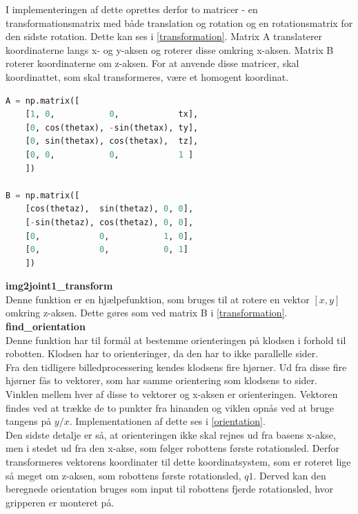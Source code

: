 I implementeringen af dette oprettes derfor to matricer - en transformationsmatrix med både translation og rotation og en rotationsmatrix for den sidste rotation. Dette kan ses i \autoref{transformation}. Matrix A translaterer koordinaterne langs x- og y-aksen og roterer disse omkring x-aksen. Matrix B roterer koordinaterne om z-aksen. For at anvende disse matricer, skal koordinattet, som skal transformeres, være et homogent koordinat.

\begin{lstlisting}[caption=Matricer til transformation., label=transformation, language=Python]
A = np.matrix([
    [1, 0,           0,            tx],
    [0, cos(thetax), -sin(thetax), ty],
    [0, sin(thetax), cos(thetax),  tz],
    [0, 0,           0,            1 ]
    ])

B = np.matrix([
    [cos(thetaz),  sin(thetaz), 0, 0],
    [-sin(thetaz), cos(thetaz), 0, 0],
    [0,            0,           1, 0],
    [0,            0,           0, 1]
    ])
\end{lstlisting}


\textbf{img2joint1\_transform} \\
Denne funktion er en hjælpefunktion, som bruges til at rotere en vektor $[x,y]$ omkring z-aksen. Dette gøres som ved matrix B i \autoref{transformation}. \\


\textbf{find\_orientation} \\
Denne funktion har til formål at bestemme orienteringen på klodsen i forhold til robotten. Klodsen har to orienteringer, da den har to ikke parallelle sider. \\

Fra den tidligere billedprocessering kendes klodsens fire hjørner. Ud fra disse fire hjørner fås to vektorer, som har samme orientering som klodsens to sider. Vinklen mellem hver af disse to vektorer og x-aksen er orienteringen. Vektoren findes ved at trække de to punkter fra hinanden og viklen opnås ved at bruge tangens på $y/x$. Implementationen af dette ses i \autoref{orientation}. \\

Den sidste detalje er så, at orienteringen ikke skal rejnes ud fra basens x-akse, men i stedet ud fra den x-akse, som følger robottens første rotationsled. Derfor transformeres vektorens koordinater til dette koordinatsystem, som er roteret lige så meget om z-aksen, som robottens første rotationsled, $q1$. Derved kan den beregnede orientation bruges som input til robottens fjerde rotationsled, hvor gripperen er monteret på. \\

